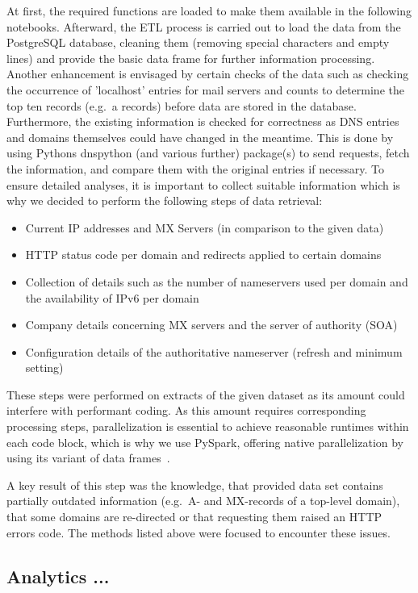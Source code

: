 At first, the required functions are loaded to make them available in the following notebooks.
Afterward, the ETL process is carried out to load the data from the PostgreSQL database, cleaning them (removing special characters and empty lines) and provide the basic data frame for further information processing.
Another enhancement is envisaged by certain checks of the data such as checking the occurrence of 'localhost' entries for mail servers and counts to determine the top ten records (e.g.\ a records) before data are stored in the database.
Furthermore, the existing information is checked for correctness as DNS entries and domains themselves could have changed in the meantime.
This is done by using Pythons dnspython (and various further) package(s) to send requests, fetch the information, and compare them with the original entries if necessary.
To ensure detailed analyses, it is important to collect suitable information which is why we decided to perform the following steps of data retrieval:
\begin{itemize}
    \item Current IP addresses and MX Servers (in comparison to the given data)
    \item HTTP status code per domain and redirects applied to certain domains
    \item Collection of details such as the number of nameservers used per domain and the availability of IPv6 per domain
    \item Company details concerning MX servers and the server of authority (SOA)
    \item Configuration details of the authoritative nameserver (refresh and minimum setting)
\end{itemize}
These steps were performed on extracts of the given dataset as its amount could interfere with performant coding.
As this amount requires corresponding processing steps, parallelization is essential to achieve reasonable runtimes within each code block, which is why we use PySpark, offering native parallelization by using its variant of data frames~\autocite[cf.][]{Weber.2019}.

A key result of this step was the knowledge, that provided data set contains partially outdated information (e.g.\ A- and MX-records of a top-level domain), that some domains are re-directed or that requesting them raised an HTTP errors code.
The methods listed above were focused to encounter these issues.

\subsection{Analytics ...}\label{subsec:analytics}

